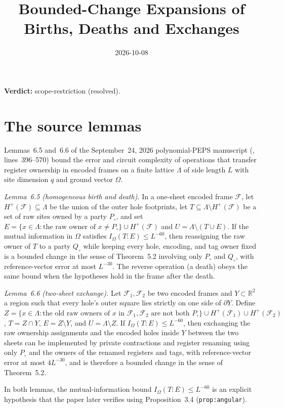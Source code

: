 \documentclass{article}
\title{Bounded-Change Expansions of Births, Deaths and Exchanges}
\author{}
\date{2026-10-08}
\providecommand{\gapnote}[2]{\par\noindent\textbf{Verdict:} #1 (#2).\par}
\begin{document}
\maketitle
\gapnote{scope-restriction}{resolved}

\section{The source lemmas}

Lemmas~6.5 and~6.6 of the September~24, 2026 polynomial-PEPS manuscript
(, lines~396--570) bound the error and circuit complexity of
operations that transfer register ownership in encoded frames on a finite
lattice $\Lambda$ of side length $L$ with site dimension $q$ and ground vector
$\Omega$.

\emph{Lemma~6.5 (homogeneous birth and death).} In a one-sheet encoded frame
$\mathcal F$, let $H^+(\mathcal F)\subseteq\Lambda$ be the union of the outer
hole footprints, let $T\subseteq\Lambda\setminus H^+(\mathcal F)$ be a set of
raw sites owned by a party $P_\circ$, and set
$E=\{x\in\Lambda:\text{the raw owner of }x\neq P_\circ\}\cup H^+(\mathcal F)$
and $U=\Lambda\setminus(T\cup E)$. If the mutual information in $\Omega$
satisfies $I_\Omega(T:E)\le L^{-60}$, then reassigning the raw owner of $T$ to
a party $Q_\circ$ while keeping every hole, encoding, and tag owner fixed is a
bounded change in the sense of Theorem~5.2 involving only $P_\circ$ and
$Q_\circ$, with reference-vector error at most $L^{-30}$. The reverse operation
(a death) obeys the same bound when the hypotheses hold in the frame after the
death.

\emph{Lemma~6.6 (two-sheet exchange).} Let $\mathcal F_1,\mathcal F_2$ be two
encoded frames and $Y\subset\mathbb R^2$ a region such that every hole's outer
square lies strictly on one side of $\partial Y$. Define
$Z=\{x\in\Lambda:\text{the old raw owners of }x\text{ in }\mathcal F_1,\mathcal
F_2\text{ are not both }P_\circ\}\cup H^+(\mathcal F_1)\cup H^+(\mathcal F_2)$,
$T=Z\cap Y$, $E=Z\setminus Y$, and $U=\Lambda\setminus Z$. If
$I_\Omega(T:E)\le L^{-60}$, then exchanging the raw ownership assignments and
the encoded holes inside $Y$ between the two sheets can be implemented by
private contractions and register renaming using only $P_\circ$ and the owners
of the renamed registers and tags, with reference-vector error at most
$4L^{-30}$, and is therefore a bounded change in the sense of Theorem~5.2.

In both lemmas, the mutual-information bound $I_\Omega(T:E)\le L^{-60}$ is an
explicit hypothesis that the paper later verifies using Proposition~3.4
(\texttt{prop:angular}).
\end{document}
